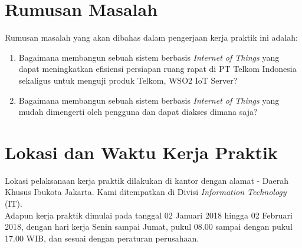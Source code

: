\section{Rumusan Masalah}
\tab Rumusan masalah yang akan dibahas dalam pengerjaan kerja praktik ini adalah:
\begin{enumerate}
	\item Bagaimana membangun sebuah sistem berbasis \textit{Internet of Things} yang dapat meningkatkan efisiensi persiapan ruang rapat di PT Telkom Indonesia sekaligus untuk menguji produk Telkom, WSO2 IoT Server?
	\item Bagaimana membangun sebuah sistem berbasis \textit{Internet of Things} yang mudah dimengerti oleh pengguna dan dapat diakses dimana saja?
	
\end{enumerate}

\section{Lokasi dan Waktu Kerja Praktik}
\tab Lokasi pelaksanaan kerja praktik dilakukan di kantor \perusahaan dengan alamat \alamatPerusahaan - Daerah Khusus Ibukota Jakarta. Kami ditempatkan di Divisi \textit{Information Technology} (IT).\\
\tab Adapun kerja praktik dimulai pada tanggal 02 Januari 2018 hingga 02 Februari 2018, dengan hari kerja Senin sampai Jumat, pukul 08.00 sampai dengan pukul 17.00 WIB, dan sesuai dengan peraturan perusahaan.

